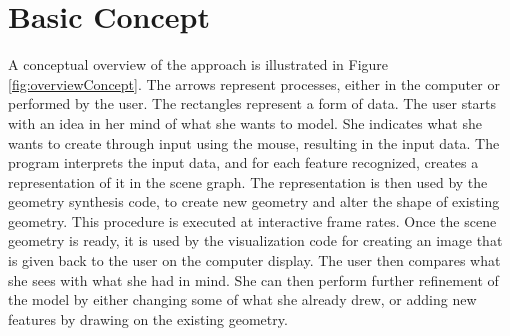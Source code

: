 \documentclass[a4paper,12pt]{report}
\begin{document}
\section{Basic Concept}
\label{sec:concept}
 A conceptual overview of the approach is illustrated in Figure \ref{fig:overviewConcept}. The arrows represent processes, either in the computer or performed by the user. The rectangles represent a form of data. The user starts with an idea in her mind of what she wants to model. She indicates what she wants to create through input using the mouse, resulting in the input data. The program interprets the input data, and for each feature recognized, creates a representation of it in the scene graph. The representation is then used by the geometry synthesis code, to create new geometry and alter the shape of existing geometry. This procedure is executed at interactive frame rates. Once the scene geometry is ready, it is used by the visualization code for creating an image that is given back to the user on the computer display. The user then compares what she sees with what she had in mind. She can then perform further refinement of the model by either changing some of what she already drew, or adding new features by drawing on the existing geometry. %
\end{document}
